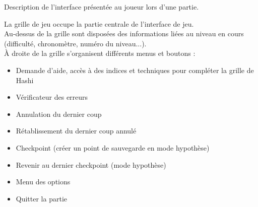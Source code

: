 {
    Description de l'interface présentée au joueur lors d'une partie.
    \label{fonc:interface}
}
{
    La grille de jeu occupe la partie centrale de l'interface de jeu.\\
    Au-dessus de la grille sont disposées des informations liées au niveau en cours (difficulté, chronomètre, numéro du niveau...).\\
    À droite de la grille s'organisent différents menus et boutons :
    \noexpand\begin{itemize}
        \noexpand\item Demande d'aide, accès à des indices et techniques pour compléter la grille de Hashi
        \noexpand\item Vérificateur des erreurs
        \noexpand\item Annulation du dernier coup
        \noexpand\item Rétablissement du dernier coup annulé
        \noexpand\item Checkpoint (créer un point de sauvegarde en mode hypothèse)
        \noexpand\item Revenir au dernier checkpoint (mode hypothèse)
        \noexpand\item Menu des options
        \noexpand\item Quitter la partie
    \noexpand\end{itemize}
}